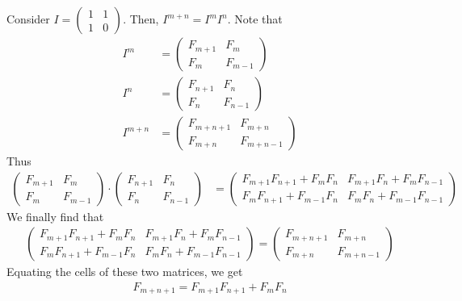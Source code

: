 \documentclass{subfile}
\begin{document}
\begin{solution}
Consider $I=\begin{pmatrix}
1 & 1\\
1 & 0
\end{pmatrix}$. Then, $I^{m+n}=I^mI^n$. Note that
	\begin{align*}
	I^m
		& =
		\begin{pmatrix}
			F_{m+1} & F_m\\
			F_m & F_{m-1}
		\end{pmatrix}\\
	I^n
		& =
		\begin{pmatrix}
			F_{n+1} & F_n\\
			F_n & F_{n-1}
		\end{pmatrix}\\
	 I^{m+n}
	 	& =
		\begin{pmatrix}
			F_{m+n+1} & F_{m+n}\\
			F_{m+n} & F_{m+n-1}
		\end{pmatrix}
	\end{align*}
Thus
\begin{align*}
\begin{pmatrix}
F_{m+1} & F_m\\
F_m & F_{m-1}
\end{pmatrix}
\cdot
\begin{pmatrix}
F_{n+1} & F_n\\
F_n & F_{n-1}
\end{pmatrix}
	& =
	\begin{pmatrix}
	F_{m+1}F_{n+1}+F_mF_n & F_{m+1}F_n+F_mF_{n-1}\\
	F_mF_{n+1}+F_{m-1}F_n & F_mF_n+F_{m-1}F_{n-1}
	\end{pmatrix}
\end{align*}
We finally find that
\begin{align*}
\begin{pmatrix}
F_{m+1}F_{n+1}+F_mF_n & F_{m+1}F_n+F_mF_{n-1}\\
F_mF_{n+1}+F_{m-1}F_n & F_mF_n+F_{m-1}F_{n-1}
\end{pmatrix}=
\begin{pmatrix}
F_{m+n+1} & F_{m+n}\\
F_{m+n} & F_{m+n-1}
\end{pmatrix}
\end{align*}
Equating the cells of these two matrices, we get
\begin{align*}
F_{m+n+1}=F_{m+1}F_{n+1}+F_mF_n
\end{align*}
\end{solution}
\end{document}
